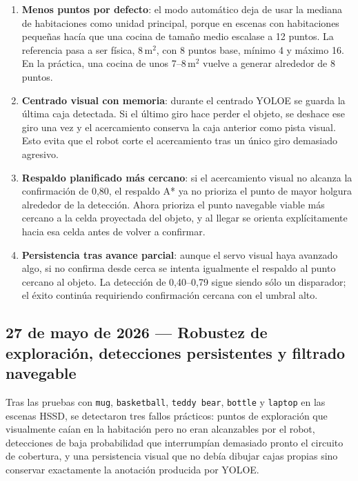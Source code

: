 \documentclass[11pt,a4paper]{article}
\begin{document}
\begin{enumerate}
  \item \textbf{Menos puntos por defecto}: el modo automático deja de usar la
        mediana de habitaciones como unidad principal, porque en escenas con
        habitaciones pequeñas hacía que una cocina de tamaño medio escalase a
        12 puntos. La referencia pasa a ser física, 8\,m\(^2\), con 8 puntos
        base, mínimo 4 y máximo 16. En la práctica, una cocina de unos
        7--8\,m\(^2\) vuelve a generar alrededor de 8 puntos.
  \item \textbf{Centrado visual con memoria}: durante el centrado YOLOE se
        guarda la última caja detectada. Si el último giro hace perder el
        objeto, se deshace ese giro una vez y el acercamiento conserva la caja
        anterior como pista visual. Esto evita que el robot corte el
        acercamiento tras un único giro demasiado agresivo.
  \item \textbf{Respaldo planificado más cercano}: si el acercamiento visual no
        alcanza la confirmación de 0,80, el respaldo A* ya no prioriza el punto
        de mayor holgura alrededor de la detección. Ahora prioriza el punto
        navegable viable más cercano a la celda proyectada del objeto, y al
        llegar se orienta explícitamente hacia esa celda antes de volver a
        confirmar.
  \item \textbf{Persistencia tras avance parcial}: aunque el servo visual haya
        avanzado algo, si no confirma desde cerca se intenta igualmente el
        respaldo al punto cercano al objeto. La detección de 0,40--0,79 sigue
        siendo sólo un disparador; el éxito continúa requiriendo confirmación
        cercana con el umbral alto.
\end{enumerate}

\subsection*{27 de mayo de 2026 --- Robustez de exploración, detecciones persistentes y filtrado navegable}

Tras las pruebas con \texttt{mug}, \texttt{basketball}, \texttt{teddy bear},
\texttt{bottle} y \texttt{laptop} en las escenas HSSD, se detectaron tres
fallos prácticos: puntos de exploración que visualmente caían en la habitación
pero no eran alcanzables por el robot, detecciones de baja probabilidad que
interrumpían demasiado pronto el circuito de cobertura, y una persistencia
visual que no debía dibujar cajas propias sino conservar exactamente la
anotación producida por YOLOE.
\end{document}
